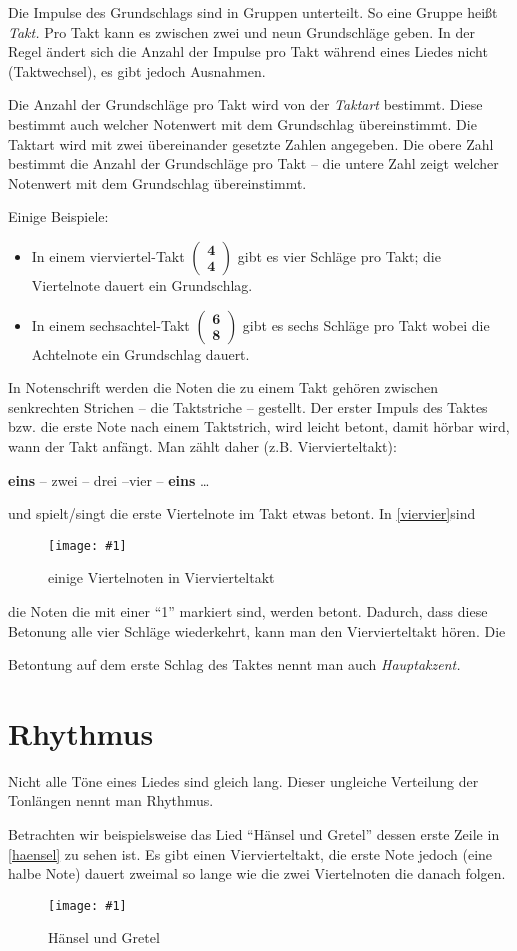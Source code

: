 \documentclass[10pt,a4paper,twoside]{report}
\newcommand{\comment}[1]{
	\marginpar{
		\textsf{#1}
	}
}
\newcommand{\image}[4]{
	\begin{figure}[!ht]
		\centering
		\texttt{[image: \#1]}
		\caption{#2}
		\label{#3}
	\end{figure}
}
\begin{document}
Die Impulse des Grundschlags sind in Gruppen unterteilt. So eine Gruppe heißt 
\emph{Takt.}\comment{Takt}Pro Takt kann es zwischen zwei und neun
Grundschläge geben. 
In der Regel ändert sich die Anzahl der Impulse pro Takt während eines
Liedes nicht (Taktwechsel), es gibt jedoch Ausnahmen. 


Die Anzahl der Grundschläge pro Takt wird von der \emph{Taktart}
bestimmt.\comment{Taktart}Diese bestimmt auch welcher Notenwert
mit dem Grundschlag übereinstimmt. Die Taktart wird mit zwei 
übereinander gesetzte Zahlen angegeben. Die obere Zahl bestimmt die Anzahl
der Grundschläge pro Takt -- die untere Zahl zeigt welcher Notenwert mit dem
Grundschlag übereinstimmt.


Einige Beispiele:
\parskip 0pt
\begin{itemize}
\item In einem vierviertel-Takt $ \left( \begin{array}{c}\textbf{4} \\ \textbf{4} \end{array}\right)  $
gibt es vier Schläge pro Takt; die Viertelnote dauert ein Grundschlag.
\item In einem sechsachtel-Takt $ \left( \begin{array}{c}\textbf{6} \\ \textbf{8} \end{array}\right)  $
gibt es sechs Schläge pro Takt wobei die Achtelnote ein Grundschlag dauert.
\end{itemize}
\parskip 3pt

In Notenschrift werden die Noten die zu einem Takt gehören zwischen senkrechten 
Strichen -- die Taktstriche -- gestellt.
Der erster Impuls des Taktes bzw. die erste Note nach einem Taktstrich, wird
leicht betont, damit hörbar wird, wann der Takt anfängt. Man zählt daher (z.B. 
Viervierteltakt):

\hspace{2cm}\textbf{eins} -- zwei -- drei --vier -- \textbf{eins} \dots

und spielt/singt die erste Viertelnote im Takt etwas betont. In 
\autoref{viervier}sind
\image{lilypond/viervier.png}{einige Viertelnoten in
    Viervierteltakt}{viervier}{6}
die Noten die mit einer "`1"' markiert sind, werden betont. Dadurch, dass diese
Betonung alle vier Schläge wiederkehrt, kann man den Viervierteltakt 
hören. Die  
\comment{Hauptakzent}Betontung auf dem erste Schlag des 
Taktes nennt man auch \emph{Hauptakzent.}

\section{Rhythmus}
Nicht alle Töne eines Liedes sind gleich lang. Dieser ungleiche Verteilung der 
Tonlängen nennt man Rhythmus.\comment{Rhythmus}
Betrachten wir beispielsweise das Lied "`Hänsel
und Gretel"' dessen erste Zeile in \autoref{haensel} zu sehen ist. %
Es gibt einen Viervierteltakt,
die erste Note jedoch (eine halbe Note) dauert zweimal so lange wie die zwei
Viertelnoten die danach folgen. 
\image{lilypond/haensel.png}{Hänsel und Gretel}{haensel}{10}%
\end{document}
